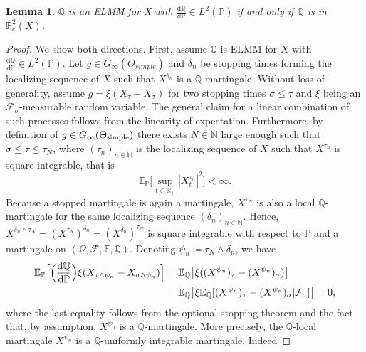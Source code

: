 \documentclass[11pt,a4paper,twoside,openany]{report}
\numberwithin{equation}{section}
\newcommand{\diff}{\mathrm{d}}
\theoremstyle{plain} %
\newtheorem{lemma}[theorem]{Lemma}
\theoremstyle{definition} %
\theoremstyle{remark} %
\begin{document}
\begin{lemma}\label{lemma:ELMM and P_e^2(X)}
    \(\mathbb{Q}\) is an ELMM for X with \(\frac{\diff \mathbb{Q}}{\diff \mathbb{P}}\in L^2(\mathbb{P})\) if and only if \(\mathbb{Q}\) is in \(\mathbb{P}_e^2(X)\).
\end{lemma}
\begin{proof}
    We show both directions. First, assume \(\mathbb{Q}\) is ELMM for \(X\) with \(\frac{\diff \mathbb{Q}}{\diff \mathbb{P}}\in L^2(\mathbb{P})\). 
    Let \(g\in G_{\infty}(\Theta_{simple})\) and \(\delta_n\) be stopping times forming the localizing sequence of \(X\) such that \(X^{\delta_n}\) is a \(\mathbb{Q}\)-martingale. Without loss of generality, assume \(g=\xi(X_{\tau}-X_{\sigma})\) for two stopping times \(\sigma\leq\tau\) and \(\xi\) being an \(\mathcal{F}_{\sigma}\)-measurable random variable. The general claim for a linear combination of such processes follows from the linearity of expectation. 
    Furthermore, by definition of \(g\in G_{\infty}(\Theta_{\rm{simple}})\) there exists \(N\in\mathbb{N}\) large enough such that \(\sigma\leq\tau\leq \tau_N\), where \((\tau_n)_{n\in\mathbb{N}}\) is the localizing sequence of \(X\) such that \(X^{\tau_n}\) is square-integrable, that is 
    \begin{equation*}
        \mathbb{E}_{\mathbb{P}}\Big[\sup_{t\in\mathbb{R}_+}|X_t^{\tau_n}|^2\Big]<\infty.
    \end{equation*}
    Because a stopped martingale is again a martingale, \(X^{\tau_N}\) is also a local \(\mathbb{Q}\)-martingale for the same localizing sequence \((\delta_n)_{n\in\mathbb{N}}\). Hence, 
    \(X^{\delta_n\wedge \tau_N}=(X^{\tau_N})^{\delta_n}=(X^{\delta_n})^{\tau_N}\) is square integrable with respect to \(\mathbb{P}\) and a martingale on \((\Omega,\mathcal{F},\mathbb{F},\mathbb{Q})\).
 Denoting \(\psi_n\coloneqq \tau_N\wedge \delta_n\), we have
    \begin{align}\label{eq:common localizing sequence}
        \mathbb{E}_\mathbb{P}\Big[\Big(\frac{\diff\mathbb{Q}}{\diff\mathbb{P}}\Big)\xi(X_{\tau\wedge\psi_n}-X_{\sigma\wedge\psi_n})\Big]&
        =\mathbb{E}_\mathbb{Q}\big[\xi((X^{\psi_n})_{\tau}-(X^{\psi_n})_{\sigma})\big]\notag\\&
        =\mathbb{E}_\mathbb{Q}\big[\xi\mathbb{E}_\mathbb{Q}[(X^{\psi_n})_{\tau}-(X^{\psi_n})_{\sigma}|\mathcal{F}_{\sigma}]\big]=0,
    \end{align}
    where the last equality follows from the optional stopping theorem and the fact that, by assumption, \(X^{\psi_n}\) is a \(\mathbb{Q}\)-martingale. More precisely, the \(\mathbb{Q}\)-local martingale \(X^{\psi_n}\) is a \(\mathbb{Q}\)-uniformly integrable martingale. Indeed 

\end{proof}
\end{document}
